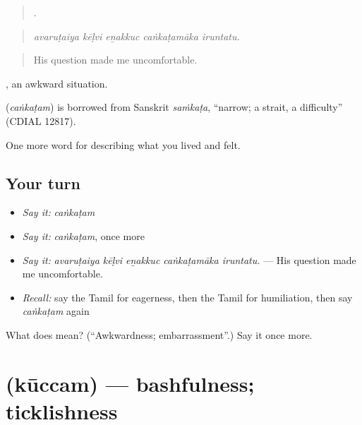 \begin{quote}
    .
\end{quote}

\begin{quote}
\emph{avaruṭaiya kēḷvi eṉakkuc caṅkaṭamāka iruntatu.}
\end{quote}

\begin{quote}
His question made me uncomfortable.
\end{quote}

 , an awkward situation.

\begin{cousinweb}
\textbf{} (\emph{caṅkaṭam}) is borrowed from Sanskrit \emph{saṁkaṭa}, \textquotedblleft{}narrow; a strait, a difficulty\textquotedblright{} (CDIAL 12817).
\end{cousinweb}

\begin{grammarlens}[title={What you've built}]
One more word for describing what you lived and felt.
\end{grammarlens}

\subsection*{Your turn}
\begin{itemize}
\raggedright
  \item \emph{Say it:} \emph{caṅkaṭam}
  \item \emph{Say it:} \emph{caṅkaṭam}, once more
  \item \emph{Say it:} \emph{avaruṭaiya kēḷvi eṉakkuc caṅkaṭamāka iruntatu.} — His question made me uncomfortable.
  \item \emph{Recall:} say the Tamil for eagerness, then the Tamil for humiliation, then say \emph{caṅkaṭam} again
\end{itemize}

\begin{tcolorbox}[breakable,colback=teal!4,colframe=teal!35!black,title={Before you move on}]
What does  mean? (\textquotedblleft{}Awkwardness; embarrassment\textquotedblright{}.) Say it once more.
\end{tcolorbox}
\section[\texorpdfstring{\ta{கூச்சம்} (kūccam)}{கூச்சம் (kūccam)}]{ (kūccam) — bashfulness; ticklishness}

